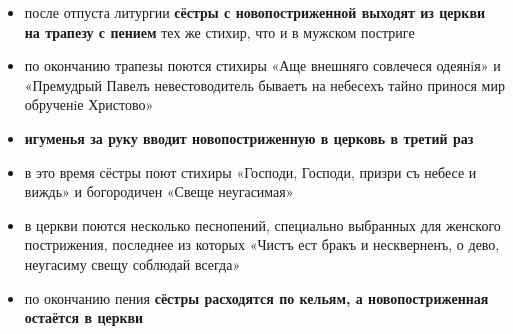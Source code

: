 \begin{itemize}
\tightlist
\item
  после отпуста литургии \textbf{сёстры с новопостриженной выходят из церкви на трапезу с пением} тех же стихир, что и в мужском постриге
\item
  по окончанию трапезы поются стихиры «Аще внешняго совлечеся одеянiя» и «Премудрый Павелъ невестоводитель бываетъ на небесехъ тайно принося мир обрученiе Христово»
\item
  \textbf{игуменья за руку вводит новопостриженную в церковь в третий раз}
\item
  в это время сёстры поют стихиры «Господи, Господи, призри съ небесе и виждь» и богородичен «Свеще неугасимая»
\item
  в церкви поются несколько песнопений, специально выбранных для женского пострижения, последнее из которых «Чистъ ест бракъ и нескверненъ, о дево, неугасиму свещу соблюдай всегда»
\item
  по окончанию пения \textbf{сёстры расходятся по кельям, а новопостриженная остаётся в церкви}
\end{itemize}
